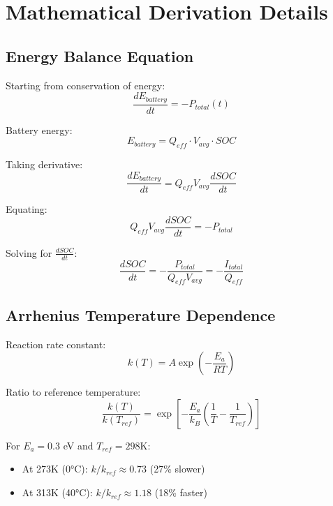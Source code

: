 \documentclass[12pt]{article}
\begin{document}
\newpage
\appendix

\section{Mathematical Derivation Details}

\subsection{Energy Balance Equation}

Starting from conservation of energy:
\begin{equation}
\frac{dE_{battery}}{dt} = -P_{total}(t)
\end{equation}

Battery energy:
\begin{equation}
E_{battery} = Q_{eff} \cdot V_{avg} \cdot SOC
\end{equation}

Taking derivative:
\begin{equation}
\frac{dE_{battery}}{dt} = Q_{eff} V_{avg} \frac{dSOC}{dt}
\end{equation}

Equating:
\begin{equation}
Q_{eff} V_{avg} \frac{dSOC}{dt} = -P_{total}
\end{equation}

Solving for $\frac{dSOC}{dt}$:
\begin{equation}
\frac{dSOC}{dt} = -\frac{P_{total}}{Q_{eff} V_{avg}} = -\frac{I_{total}}{Q_{eff}}
\end{equation}

\subsection{Arrhenius Temperature Dependence}

Reaction rate constant:
\begin{equation}
k(T) = A \exp\left(-\frac{E_a}{RT}\right)
\end{equation}

Ratio to reference temperature:
\begin{equation}
\frac{k(T)}{k(T_{ref})} = \exp\left[-\frac{E_a}{k_B}\left(\frac{1}{T} - \frac{1}{T_{ref}}\right)\right]
\end{equation}

For $E_a = 0.3$ eV and $T_{ref} = 298$K:
\begin{itemize}
\item At 273K (0°C): $k/k_{ref} \approx 0.73$ (27\% slower)
\item At 313K (40°C): $k/k_{ref} \approx 1.18$ (18\% faster)
\end{itemize}
\end{document}
